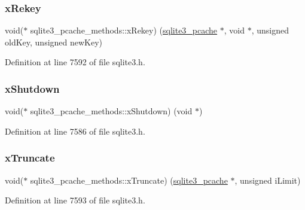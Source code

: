 \subsubsection{\texorpdfstring{x\+Rekey}{xRekey}}
{\footnotesize\ttfamily void($\ast$ sqlite3\+\_\+pcache\+\_\+methods\+::x\+Rekey) (\mbox{\hyperlink{sqlite3_8h_a096c453d937d51f7926d7d31c8e0bd2f}{sqlite3\+\_\+pcache}} $\ast$, void $\ast$, unsigned old\+Key, unsigned new\+Key)}



Definition at line 7592 of file sqlite3.\+h.

\mbox{\label{structsqlite3__pcache__methods_aa2835c25fac454b7ee7cfd9e625700d7}} 
\subsubsection{\texorpdfstring{x\+Shutdown}{xShutdown}}
{\footnotesize\ttfamily void($\ast$ sqlite3\+\_\+pcache\+\_\+methods\+::x\+Shutdown) (void $\ast$)}



Definition at line 7586 of file sqlite3.\+h.

\mbox{\label{structsqlite3__pcache__methods_adc097defb1e83c6442fc0d47ac79cec9}} 
\subsubsection{\texorpdfstring{x\+Truncate}{xTruncate}}
{\footnotesize\ttfamily void($\ast$ sqlite3\+\_\+pcache\+\_\+methods\+::x\+Truncate) (\mbox{\hyperlink{sqlite3_8h_a096c453d937d51f7926d7d31c8e0bd2f}{sqlite3\+\_\+pcache}} $\ast$, unsigned i\+Limit)}



Definition at line 7593 of file sqlite3.\+h.

\mbox{\label{structsqlite3__pcache__methods_a2aa1aefc301a0fe4998ed8397b028630}} 
